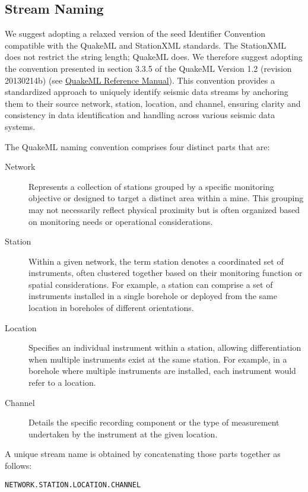 \subsection{Stream Naming}

We suggest adopting a relaxed version of the \gls{seed} Identifier Convention compatible with the QuakeML and StationXML standards. The StationXML does not restrict the string length; QuakeML does. We therefore suggest adopting the convention presented in section 3.3.5 of the QuakeML Version 1.2 (revision 20130214b) (see \href{https://quake.ethz.ch/quakeml/docs/latest?action=AttachFile&do=get&target=QuakeML-BED.pdf}{QuakeML Reference Manual}). This convention provides a standardized approach to uniquely identify seismic data streams by anchoring them to their source network, station, location, and channel, ensuring clarity and consistency in data identification and handling across various seismic data systems.

The QuakeML naming convention comprises four distinct parts that are:

\begin{description}
  \item[Network] Represents a collection of stations grouped by a specific monitoring objective or designed to target a distinct area within a mine. This grouping may not necessarily reflect physical proximity but is often organized based on monitoring needs or operational considerations.
  \item[Station] Within a given network, the term station denotes a coordinated set of instruments, often clustered together based on their monitoring function or spatial considerations. For example, a station can comprise a set of instruments installed in a single borehole or deployed from the same location in boreholes of different orientations.
  \item[Location] Specifies an individual instrument within a station, allowing differentiation when multiple instruments exist at the same station. For example, in a borehole where multiple instruments are installed, each instrument would refer to a location.
  \item[Channel] Details the specific recording component or the type of measurement undertaken by the instrument at the given location.
\end{description}

A unique stream name is obtained by concatenating those parts together as follows:
\begin{center}
\texttt{NETWORK.STATION.LOCATION.CHANNEL}
\end{center}





